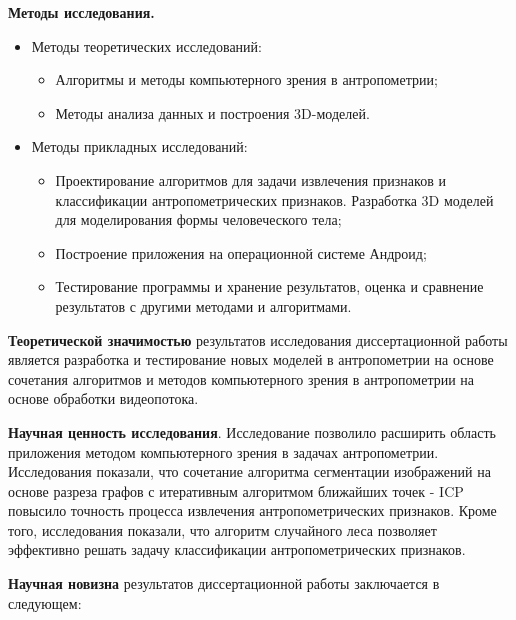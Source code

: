 \textbf{Методы исследования.} 
\begin{itemize}
	\item Методы  теоретических исследований:
	
	\begin{itemize}
		\item Алгоритмы и методы компьютерного зрения в антропометрии;
		\item Методы анализа данных и построения 3D-моделей.
	\end{itemize}
	
\end{itemize}
\begin{itemize}
	\item Методы прикладных исследований:
	
	\begin{itemize}
		\item Проектирование алгоритмов для задачи извлечения признаков и классификации антропометрических признаков. Разработка 3D моделей для моделирования формы человеческого тела;
		\item Построение приложения на операционной системе Андроид;
		\item Тестирование программы и хранение результатов, оценка и сравнение результатов с другими методами и алгоритмами.
	\end{itemize}
	
\end{itemize}

\textbf{Теоретической значимостью} результатов исследования диссертационной работы является разработка и тестирование новых моделей в антропометрии на основе сочетания алгоритмов и методов компьютерного зрения в антропометрии на основе обработки видеопотока.

\textbf{Научная ценность исследования}. Исследование позволило расширить область приложения методом компьютерного зрения в задачах антропометрии. Исследования показали, что сочетание алгоритма сегментации изображений на основе разреза графов с  итеративным алгоритмом ближайших точек -  ICP повысило точность процесса извлечения антропометрических признаков. Кроме того, исследования показали, что алгоритм случайного леса позволяет эффективно решать задачу классификации антропометрических признаков.

\textbf{Научная новизна} результатов диссертационной работы заключается в следующем:

